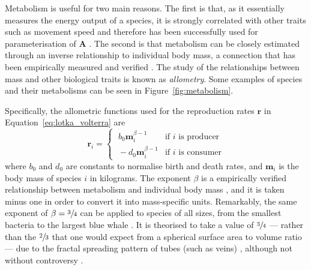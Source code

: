 Metabolism is useful for two main reasons. The first is that, as it essentially measures the energy output of a species, it is strongly correlated with other traits such as movement speed \cite{Hirt2017} and therefore has been successfully used for parameterisation of $\mathbf{A}$ \cite{Savage2004, Vucic-Pestic2010, Pawar2015}. The second is that metabolism can be closely estimated through an inverse relationship to individual body mass, a connection that has been empirically measured and verified \cite{Brown2004}. The study of the relationships between mass and other biological traits is known as \emph{allometry}. Some examples of species and their metabolisms can be seen in Figure~\ref{fig:metabolism}.

Specifically, the allometric functions used for the reproduction rates $\mathbf{r}$ in Equation~\eqref{eq:lotka_volterra} are
\begin{equation}
  \mathbf{r}_i =
  \begin{cases}
    \;b_0\mathbf{m}_i^{\beta-1} & \text{if $i$ is producer}\\
    \;-d_0\mathbf{m}_i^{\beta-1} & \text{if $i$ is consumer}
  \end{cases}
  \label{eq:metabolism_beta}
\end{equation}
where $b_0$ and $d_0$ are constants to normalise birth and death rates, and $\mathbf{m}_i$ is the body mass of species $i$ in kilograms. The exponent $\beta$ is a empirically verified relationship between metabolism and individual body mass \cite{Brown2004}, and it is taken minus one in order to convert it into mass-specific units.
Remarkably, the same exponent of $\beta=\sfrac{3}{4}$ can be applied to species of all sizes, from the smallest bacteria to the largest blue whale \cite{Kleiber1947}. It is theorised to take a value of $\sfrac{3}{4}$ --- rather than the $\sfrac{2}{3}$ that one would expect from a spherical surface area to volume ratio --- due to the fractal spreading pattern of tubes (such as veins) \cite{West1997}, although not without controversy \cite{Agutter2004}.

